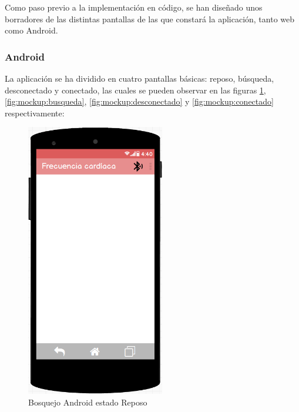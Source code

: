 Como paso previo a la implementación en código, se han diseñado unos borradores de las distintas pantallas de las que constará la aplicación, tanto web como Android.

\subsubsection{Android}
La aplicación se ha dividido en cuatro pantallas básicas: reposo, búsqueda, desconectado y conectado, las cuales se pueden observar en las figuras \ref{fig:mockup:reposo}, \ref{fig:mockup:busqueda},  \ref{fig:mockup:desconectado} y \ref{fig:mockup:conectado} respectivamente:

\begin{figure}[h] \centering
\begin{minipage}{0.45\textwidth}\centering
 \includegraphics[height=12cm]{graphs/mockup_android_initial_es.png} \caption{Bosquejo Android estado Reposo}\label{fig:mockup:reposo}
\end{minipage}\hfill
\begin{minipage}{0.45\textwidth}\centering

\end{minipage}
\end{figure}
